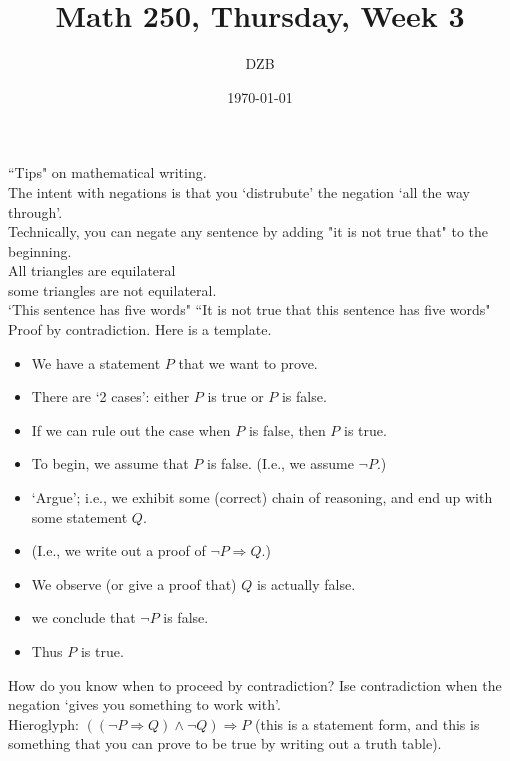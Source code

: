 \documentclass[12pt]{article}
\title{Math 250, Thursday, Week 3}
\author{DZB}
\date{\today}
\begin{document}
\maketitle

``Tips" on mathematical writing. 
\\
The intent with negations is that you `distrubute' the negation `all the way through'. 
\\

Technically, you can negate any sentence by adding "it is not true that" to the beginning. 
\\

All triangles are equilateral
\\

some triangles are not equilateral.\\

`This sentence has five words" ``It is not true that this sentence has five words"
\\

Proof by contradiction. Here is a template. 
\\

\begin{itemize}
\item We have a statement $P$ that we want to prove. 
\item There are `2 cases': either $P$ is true or $P$ is false. 
\item If we can rule out the case when $P$ is false, then $P$ is true. 
\item To begin, we assume that $P$ is false. (I.e., we assume $\neg P$.)
\item `Argue'; i.e., we exhibit some (correct) chain of reasoning, and end up with some statement $Q$.
\item (I.e., we write out a proof of $\neg P \Rightarrow Q$.)
\item We observe (or give a proof that) $Q$ is actually false. 
\item we conclude that $\neg P$ is false. 
\item Thus $P$ is true. 

\end{itemize}

How do you know when to proceed by contradiction? Ise contradiction when the negation `gives you something to work with'.
\\

Hieroglyph: $((\neg P \Rightarrow Q) \wedge \neg Q) \Rightarrow P$ (this is a statement form, and this is something that you can prove to be true by writing out a truth table).
\\
\end{document}
